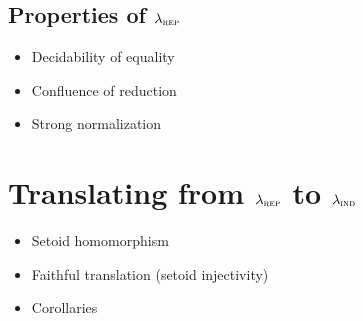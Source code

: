 \subsection{Properties of $\lambda_{\textsc{rep}}$}

\begin{itemize}
  \item Decidability of equality
  \item Confluence of reduction
  \item Strong normalization
\end{itemize}

\section{Translating from $\lambda_{\textsc{rep}}$ to $\lambda_{\textsc{ind}}$}

\begin{itemize}
  \item Setoid homomorphism
  \item Faithful translation (setoid injectivity)
  \item Corollaries
\end{itemize}




